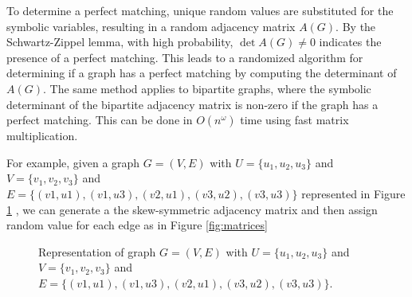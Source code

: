 \noindent To determine a perfect matching, unique random values are substituted for the symbolic variables, resulting in a random adjacency matrix \( A(G) \). By the Schwartz-Zippel lemma, with high probability, \( \det A(G) \neq 0 \) indicates the presence of a perfect matching. This leads to a randomized algorithm for determining if a graph has a perfect matching by computing the determinant of $A(G)$. The same method applies to bipartite graphs, where the symbolic determinant of the bipartite adjacency matrix is non-zero if the graph has a perfect matching. This can be done in $O(n^\omega)$ time using fast matrix multiplication. 

\noindent For example, given a graph $G=(V,E)$ with \( U = \{ u_1, u_2, u_3 \} \) and \( V = \{ v_1, v_2, v_3 \} \) and \\
$E=\{(v1,u1), (v1,u3), (v2,u1), (v3,u2), (v3,u3)\}$ represented in Figure \ref{fig:pm graph} , we can generate a the skew-symmetric adjacency matrix and then assign random value for each edge as in Figure \ref{fig:matrices}
\begin{figure}[h!]
\centering
{}
\caption{Representation of graph $G=(V,E)$ with \( U = \{ u_1, u_2, u_3 \} \) and \( V = \{ v_1, v_2, v_3 \} \) and
$E=\{(v1,u1), (v1,u3), (v2,u1), (v3,u2), (v3,u3)\}$.}
\label{fig:pm graph}
\end{figure}

